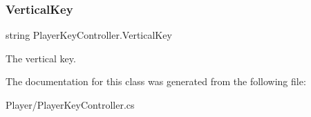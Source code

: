 \subsubsection{\texorpdfstring{Vertical\+Key}{VerticalKey}}
{\footnotesize\ttfamily string Player\+Key\+Controller.\+Vertical\+Key}



The vertical key. 



The documentation for this class was generated from the following file\+:\begin{DoxyCompactItemize}
\item 
Player/Player\+Key\+Controller.\+cs\end{DoxyCompactItemize}
